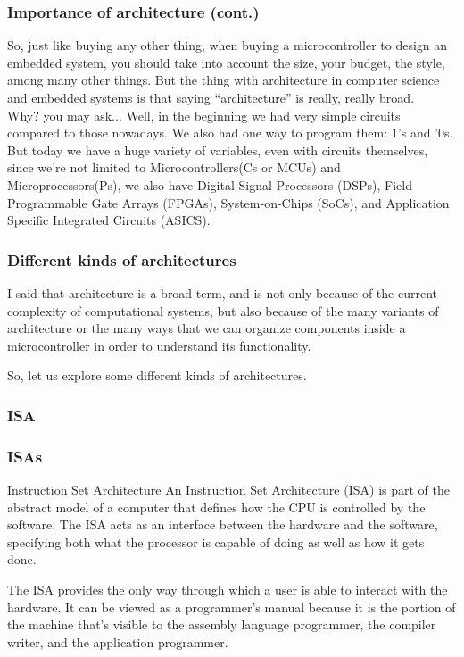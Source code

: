 \documentclass[aspectratio=169]{beamer}
\begin{document}
\begin{frame}
  \frametitle{Importance of architecture (cont.)}
  So, just like buying any other thing, when buying a microcontroller to design an embedded system, you should take into account the size, your budget, the style, among many other things. But the thing with architecture in computer science and embedded systems is that saying ``architecture'' is really, really broad. \pause \\[5mm]
  Why? you may ask... Well, in the beginning we had very simple circuits compared to those nowadays. We also had one way to program them: 1's and '0s. But today we have a huge variety of variables, even with circuits themselves, since we're not limited to Microcontrollers(\textmu Cs or MCUs) and Microprocessors(\textmu Ps), we also have Digital Signal Processors (DSPs), Field Programmable Gate Arrays (FPGAs), System-on-Chips (SoCs), and Application Specific Integrated Circuits (ASICS).  
\end{frame}

\begin{frame}
  \frametitle{Different kinds of architectures}
  I said that architecture is a broad term, and is not only because of the current complexity of computational systems, but also because of the many variants of architecture or the many ways that we can organize components inside a microcontroller in order to understand its functionality. \pause

  So, let us explore some different kinds of architectures.
\end{frame}

\subsubsection{ISA}
\begin{frame}
  \frametitle{ISAs}
    \begin{block}{Instruction Set Architecture}
      An Instruction Set Architecture (ISA) is part of the abstract model of a computer that defines how the CPU is controlled by the software. The ISA acts as an interface between the hardware and the software, specifying both what the processor is capable of doing as well as how it gets done. \cite{ISA} \pause
    \end{block} 
    The ISA provides the only way through which a user is able to interact with the hardware. It can be viewed as a programmer's manual because it is the portion of the machine that's visible to the assembly language programmer, the compiler writer, and the application programmer. 
  \end{frame}
\end{document}
